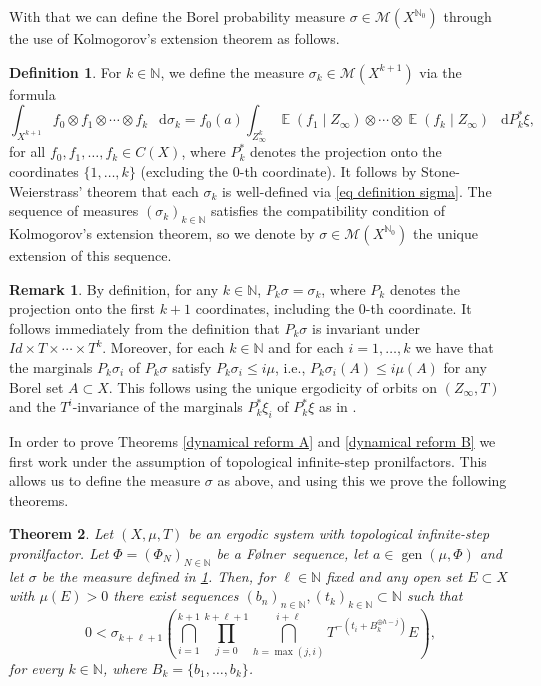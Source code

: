 \documentclass[letter, 11pt]{article}
\newcommand{\Folner}{F\o{}lner}
\newtheorem{theo}{Theorem}[section]
\theoremstyle{definition}
\newtheorem{defn}[theo]{Definition}
\newtheorem*{remark*}{Remark}
\theoremstyle{plain}
\newcommand{\N}{\mathbb{N}}
\newcommand{\cM}{\mathcal{M}}
\DeclareMathOperator\gen{gen}
\newcommand*\diff{\mathop{}\!\mathrm{d}}
\newcommand{\1}{\mathbbm{1}}
\newcommand{\E}{\operatorname{\mathbb{E}}}
\begin{document}
With that we can define the Borel probability measure $\sigma \in \cM(X^{\N_0})$ through the use of Kolmogorov's extension theorem as follows. 
\begin{defn}\label{definition of sigma}
    For $k\in \N$, we define the measure $\sigma_k\in \cM(X^{k+1})$ via the formula 
\begin{equation} \label{eq definition sigma}
    \int_{X^{k+1}} f_0 \otimes  f_1 \otimes \cdots \otimes f_k\ \diff \sigma_k = f_0(a) \int_{Z^{k}_{\infty}}  \E( f_1 \mid Z_{\infty}) \otimes \cdots \otimes \E( f_k \mid Z_{\infty})\ \diff P_k^* \xi,
\end{equation}
for all $f_0,f_1, \ldots, f_k \in C(X) $, where $P_k^*$ denotes the projection onto the coordinates $\{1,\ldots,k\}$ (excluding the $0$-th coordinate). It follows by Stone-Weierstrass' theorem that each $\sigma_k$ is well-defined via \eqref{eq definition sigma}. The sequence of measures $(\sigma_k)_{k\in \N}$ satisfies the compatibility condition of Kolmogorov's extension theorem, so we denote by $\sigma \in \cM(X^{\N_0})$ the unique extension of this sequence. 
\end{defn}

\begin{remark*}
    By definition, for any $k\in \N$, $P_k\sigma=\sigma_k$, where $P_k$ denotes the projection onto the first $k+1$ coordinates, including the $0$-th coordinate. It follows immediately from the definition that $P_k\sigma$ is invariant under $Id\times T\times \cdots \times T^k$. Moreover, for each $k\in \N$ and for each $i=1,\ldots,k$ we have that the marginals $P_k\sigma_i$ of $P_k\sigma$ satisfy $P_k\sigma_i \leq i\mu$, i.e., $P_k\sigma_i (A)\leq i\mu(A)$ for any Borel set $A\subset X$. This follows using the unique ergodicity of orbits on $(Z_{\infty},T)$ and the $T^i$-invariance of the marginals $P_k^*\xi_i$ of $P_k^*\xi$ as in \cite[Lemma 4.6]{kmrr25}.
\end{remark*}
In order to prove Theorems \ref{dynamical reform A} and \ref{dynamical reform B} we first work under the assumption of 
topological infinite-step pronilfactors. This allows us to define the measure 
$\sigma$ as above, and using this we   prove the following theorems.

\begin{theo}\label{topological pronilfactors 2}
Let $(X,\mu,T)$ be an ergodic system with topological infinite-step pronilfactor. Let $\Phi=(\Phi_N)_{N\in \N}$ be a \Folner\ sequence, let 
$a\in \gen(\mu,\Phi)$ and let $\sigma$ be the measure defined in \cref{definition of sigma}. Then, for $\ell\in \N$ fixed and any
open set $E\subset X$ with $\mu(E)>0$ there exist sequences $(b_n)_{n\in \N}, (t_k)_{k\in \N}\subset \N$ such 
that
\begin{equation*}
       0<\sigma_{k+\ell+1}\left( \bigcap_{i=1}^{k+1}  \prod_{j=0}^{k+\ell+1}\bigcap_{h=\max(j,i)}^{i+\ell}  T^{-\left( t_i+ B_k^{\oplus h-j} \right)}  E   \right),  
   \end{equation*}
for every $k\in \N$, where $B_k=\{b_1,\ldots,b_{k}\}$.
\end{theo}
\end{document}
